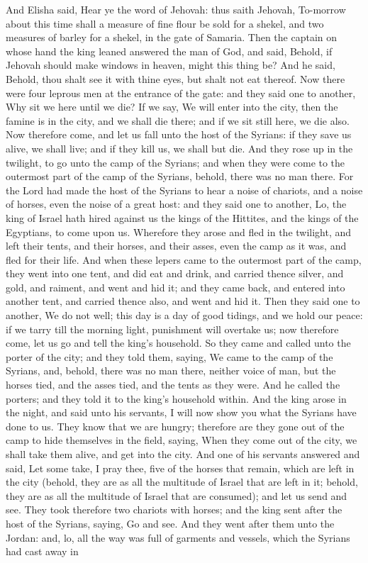 And Elisha said, Hear ye the word of Jehovah: thus saith Jehovah, To-morrow about this time shall a measure of fine flour be sold for a shekel, and two measures of barley for a shekel, in the gate of Samaria. Then the captain on whose hand the king leaned answered the man of God, and said, Behold, if Jehovah should make windows in heaven, might this thing be? And he said, Behold, thou shalt see it with thine eyes, but shalt not eat thereof.  Now there were four leprous men at the entrance of the gate: and they said one to another, Why sit we here until we die? If we say, We will enter into the city, then the famine is in the city, and we shall die there; and if we sit still here, we die also. Now therefore come, and let us fall unto the host of the Syrians: if they save us alive, we shall live; and if they kill us, we shall but die. And they rose up in the twilight, to go unto the camp of the Syrians; and when they were come to the outermost part of the camp of the Syrians, behold, there was no man there. For the Lord had made the host of the Syrians to hear a noise of chariots, and a noise of horses, even the noise of a great host: and they said one to another, Lo, the king of Israel hath hired against us the kings of the Hittites, and the kings of the Egyptians, to come upon us. Wherefore they arose and fled in the twilight, and left their tents, and their horses, and their asses, even the camp as it was, and fled for their life. And when these lepers came to the outermost part of the camp, they went into one tent, and did eat and drink, and carried thence silver, and gold, and raiment, and went and hid it; and they came back, and entered into another tent, and carried thence also, and went and hid it.  Then they said one to another, We do not well; this day is a day of good tidings, and we hold our peace: if we tarry till the morning light, punishment will overtake us; now therefore come, let us go and tell the king’s household. So they came and called unto the porter of the city; and they told them, saying, We came to the camp of the Syrians, and, behold, there was no man there, neither voice of man, but the horses tied, and the asses tied, and the tents as they were. And he called the porters; and they told it to the king’s household within. And the king arose in the night, and said unto his servants, I will now show you what the Syrians have done to us. They know that we are hungry; therefore are they gone out of the camp to hide themselves in the field, saying, When they come out of the city, we shall take them alive, and get into the city. And one of his servants answered and said, Let some take, I pray thee, five of the horses that remain, which are left in the city (behold, they are as all the multitude of Israel that are left in it; behold, they are as all the multitude of Israel that are consumed); and let us send and see. They took therefore two chariots with horses; and the king sent after the host of the Syrians, saying, Go and see. And they went after them unto the Jordan: and, lo, all the way was full of garments and vessels, which the Syrians had cast away in 